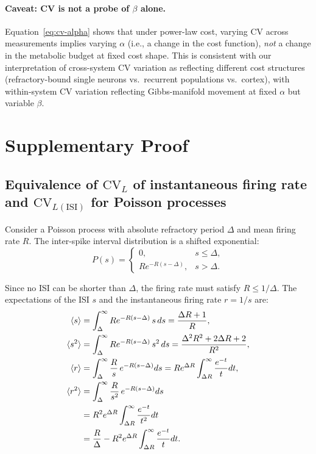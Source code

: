 \documentclass[11pt]{article}
\theoremstyle{remark}
\theoremstyle{definition}
\begin{document}
\paragraph{Caveat: CV is not a probe of $\beta$ alone.}
Equation~\eqref{eq:cv-alpha} shows that under power-law cost, varying CV across measurements implies varying $\alpha$ (i.e., a change in the cost function), \emph{not} a change in the metabolic budget at fixed cost shape.  This is consistent with our interpretation of cross-system CV variation as reflecting different cost structures (refractory-bound single neurons vs.\ recurrent populations vs.\ cortex), with within-system CV variation reflecting Gibbs-manifold movement at fixed $\alpha$ but variable $\beta$.

\section{Supplementary Proof}
\subsection{Equivalence of $\mathrm{CV}_L$ of instantaneous firing rate and $\mathrm{CV}_{L(\mathrm{ISI})}$ for Poisson processes}

Consider a Poisson process with absolute refractory period $\Delta$ and mean firing rate $R$. The inter-spike interval distribution is a shifted exponential:
\begin{equation}
P(s) =
\begin{cases}
0, & s \leq \Delta, \\
R e^{-R(s-\Delta)}, & s > \Delta.
\end{cases}
\end{equation}

Since no ISI can be shorter than $\Delta$, the firing rate must satisfy $R \leq 1/\Delta$. The expectations of the ISI $s$ and the instantaneous firing rate $r=1/s$ are:
\begin{align}
\langle s\rangle &= \int_{\Delta}^{\infty} R e^{-R(s-\Delta)}\, s\, ds
= \frac{\Delta R + 1}{R}, \\
\langle s^2\rangle &= \int_{\Delta}^{\infty} R e^{-R(s-\Delta)}\, s^2\, ds
= \frac{\Delta^2 R^2 + 2\Delta R + 2}{R^2}, \\
\langle r\rangle &= \int_{\Delta}^{\infty} \frac{R}{s}\, e^{-R(s-\Delta)} ds
= R e^{\Delta R} \int_{\Delta R}^{\infty} \frac{e^{-t}}{t} dt, \\
\langle r^2\rangle &= \int_{\Delta}^{\infty} \frac{R}{s^2}\, e^{-R(s-\Delta)} ds \notag \\
&= R^2 e^{\Delta R}\int_{\Delta R}^\infty \frac{e^{-t}}{t^2} dt\notag \\
&= \frac{R}{\Delta} - R^2 e^{\Delta R} \int_{\Delta R}^\infty \frac{e^{-t}}{t} dt.
\end{align}
\end{document}
